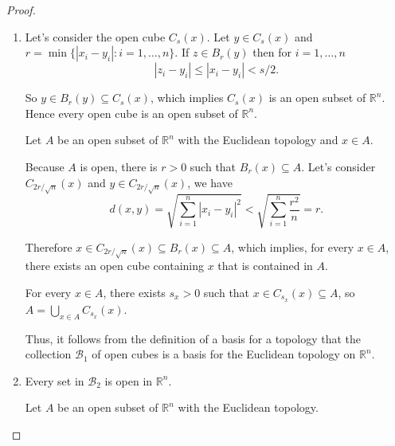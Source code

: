 \begin{proof}
	\begin{enumerate}[label={(\alph*)}]
		\item Let's consider the open cube $C_{s}(x)$. Let $y\in C_{s}(x)$ and $r = \min\{ \left\vert{x_{i} - y_{i}}\right\vert : i=1,\ldots,n \}$. If $z\in B_{r}(y)$ then for $i=1,\ldots,n$
		      \[
			      \left\vert{z_{i} - y_{i}}\right\vert \leq \left\vert{x_{i} - y_{i}}\right\vert < s/2.
		      \]

		      So $y\in B_{r}(y)\subseteq C_{s}(x)$, which implies $C_{s}(x)$ is an open subset of $\mathbb{R}^{n}$. Hence every open cube is an open subset of $\mathbb{R}^{n}$.

		      Let $A$ be an open subset of $\mathbb{R}^{n}$ with the Euclidean topology and $x\in A$.

		      Because $A$ is open, there is $r > 0$ such that $B_{r}(x)\subseteq A$. Let's consider $C_{2r/\sqrt{n}}(x)$ and $y\in C_{2r/\sqrt{n}}(x)$, we have
		      \[
			      d(x, y) = \sqrt{\sum^{n}_{i=1}{\left\vert{x_{i} - y_{i}}\right\vert}^{2}} < \sqrt{\sum^{n}_{i=1}\frac{r^{2}}{n}} = r.
		      \]

		      Therefore $x\in C_{2r/\sqrt{n}}(x)\subseteq B_{r}(x)\subseteq A$, which implies, for every $x\in A$, there exists an open cube containing $x$ that is contained in $A$.

		      For every $x\in A$, there exists $s_{x} > 0$ such that $x\in C_{s_{x}}(x)\subseteq A$, so $A = \bigcup_{x\in A}C_{s_{x}}(x)$.

		      Thus, it follows from the definition of a basis for a topology that the collection $\mathscr{B}_{1}$ of open cubes is a basis for the Euclidean topology on $\mathbb{R}^{n}$.
		\item Every set in $\mathscr{B}_{2}$ is open in $\mathbb{R}^{n}$.

		      Let $A$ be an open subset of $\mathbb{R}^{n}$ with the Euclidean topology.


\end{enumerate}
\end{proof}
